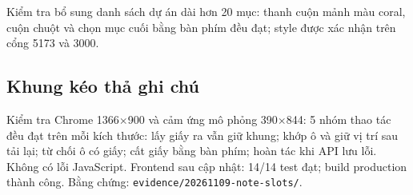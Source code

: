 Kiểm tra bổ sung danh sách dự án dài hơn 20 mục: thanh cuộn mảnh màu coral,
cuộn chuột và chọn mục cuối bằng bàn phím đều đạt; style được xác nhận trên cổng 5173 và 3000.

\subsection{Khung kéo thả ghi chú}
Kiểm tra Chrome 1366$\times$900 và cảm ứng mô phỏng 390$\times$844:
5 nhóm thao tác đều đạt trên mỗi kích thước: lấy giấy ra vẫn giữ khung;
khớp ô và giữ vị trí sau tải lại; từ chối ô có giấy;
cất giấy bằng bàn phím; hoàn tác khi API lưu lỗi. Không có lỗi JavaScript.
Frontend sau cập nhật: 14/14 test đạt; build production thành công.
Bằng chứng: \texttt{evidence/20261109-note-slots/}.

